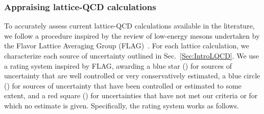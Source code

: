 \subsubsection{Appraising lattice-QCD calculations}
\label{subsubsec:BClQCD}

To accurately assess current lattice-QCD calculations
available in the literature, we follow a procedure inspired by the review of 
low-energy mesons undertaken by the Flavor Lattice Averaging Group 
(FLAG)~\cite{Aoki:2016frl}. 
%
For each lattice calculation, we characterize each source of 
uncertainty outlined in Sec.~\ref{Sec:IntroLQCD}. 
%
We use a rating system inspired by FLAG, awarding a blue star (\bstar) for 
sources of uncertainty that are well controlled or very conservatively 
estimated, a blue circle (\bcirc) for sources of uncertainty that have been 
controlled or estimated to some extent, and a red square (\rsquare) for 
uncertainties that have not met our criteria or for which no estimate is given.
%
Specifically, the rating system works as follows.

